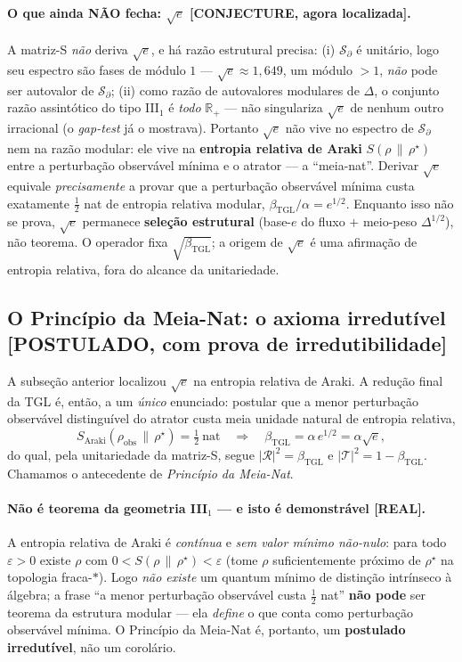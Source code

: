 \documentclass[12pt,a4paper]{article}
\newcommand{\betatgl}{\beta_{\text{TGL}}}
\newcommand{\rhostar}{\rho^{\star}}
\newcommand{\TGL}{\textsc{TGL}}
\begin{document}
\paragraph{O que ainda NÃO fecha: $\sqrt e$ \textbf{[CONJECTURE, agora localizada]}.} A matriz-S \emph{não} deriva $\sqrt e$, e há razão estrutural precisa: (i) $\mathcal S_\partial$ é unitário, logo seu espectro são fases de módulo $1$ --- $\sqrt e\approx1{,}649$, um módulo $>1$, \emph{não} pode ser autovalor de $\mathcal S_\partial$; (ii) como razão de autovalores modulares de $\Delta$, o conjunto razão assintótico do tipo III$_1$ é \emph{todo} $\mathbb R_+$ --- não singulariza $\sqrt e$ de nenhum outro irracional (o \emph{gap-test} já o mostrava).  Portanto $\sqrt e$ não vive no espectro de $\mathcal S_\partial$ nem na razão modular: ele vive na \textbf{entropia relativa de Araki} $S(\rho\,\|\,\rhostar)$ entre a perturbação observável mínima e o atrator --- a ``meia-nat''.  Derivar $\sqrt e$ equivale \emph{precisamente} a provar que a perturbação observável mínima custa exatamente $\tfrac12$ nat de entropia relativa modular, $\betatgl/\alpha=e^{1/2}$. Enquanto isso não se prova, $\sqrt e$ permanece \textbf{seleção estrutural} (base-$e$ do fluxo $+$ meio-peso $\Delta^{1/2}$), não teorema.  O operador fixa $\sqrt{\betatgl}$; a origem de $\sqrt e$ é uma afirmação de entropia relativa, fora do alcance da unitariedade.

\subsection{O Princípio da Meia-Nat: o axioma irredutível \textbf{[POSTULADO, com prova de irredutibilidade]}}
A subseção anterior localizou $\sqrt e$ na entropia relativa de Araki.  A redução final da \TGL{} é, então, a um \emph{único} enunciado: postular que a menor perturbação observável distinguível do atrator custa meia unidade natural de entropia relativa,
\begin{equation}
S_{\mathrm{Araki}}(\rho_{\mathrm{obs}}\,\|\,\rhostar)=\tfrac12\ \mathrm{nat}\quad\Longrightarrow\quad \betatgl=\alpha\,e^{1/2}=\alpha\sqrt e,
\end{equation}
do qual, pela unitariedade da matriz-S, segue $|\mathcal R|^2=\betatgl$ e $|\mathcal T|^2=1-\betatgl$.  Chamamos o antecedente de \emph{Princípio da Meia-Nat}.

\paragraph{Não é teorema da geometria III$_1$ --- e isto é demonstrável \textbf{[REAL]}.} A entropia relativa de Araki é \emph{contínua} e \emph{sem valor mínimo não-nulo}: para todo $\varepsilon>0$ existe $\rho$ com $0<S(\rho\,\|\,\rhostar)<\varepsilon$ (tome $\rho$ suficientemente próximo de $\rhostar$ na topologia fraca-$*$).  Logo \emph{não existe} um quantum mínimo de distinção intrínseco à álgebra; a frase ``a menor perturbação observável custa $\tfrac12$ nat'' \textbf{não pode} ser teorema da estrutura modular --- ela \emph{define} o que conta como perturbação observável mínima.  O Princípio da Meia-Nat é, portanto, um \textbf{postulado irredutível}, não um corolário.
\end{document}
